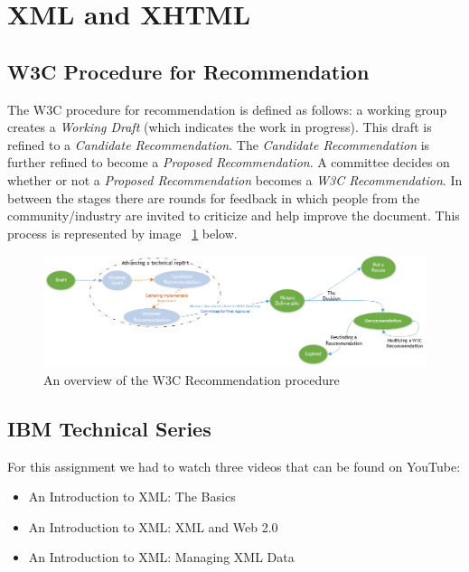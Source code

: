 
\section{XML and XHTML}

\subsection{W3C Procedure for Recommendation}

The W3C procedure for recommendation is defined as follows: a working group creates a \textit{Working Draft} (which indicates the work in progress). This draft is refined to a \textit{Candidate Recommendation}. The \textit{Candidate Recommendation} is further refined to become a \textit{Proposed Recommendation}. A committee decides on whether or not a \textit{Proposed Recommendation} becomes a \textit{W3C Recommendation}. In between the stages there are rounds for feedback in which people from the community/industry are invited to criticize and help improve the document. This process is represented by image ~\ref{fig:RecommendationProcedure} below.

\vspace{10pt}

\begin{figure}[here]
	\centering
	\includegraphics[width=1.0\textwidth]{images/w3c.png}
	\caption{An overview of the W3C Recommendation procedure}
	\label{fig:RecommendationProcedure}
\end{figure}

\subsection{IBM Technical Series}

For this assignment we had to watch three videos that can be found on YouTube:
\begin{itemize}
\item An Introduction to XML: The Basics \citep{ibmtechnicalpart1}
\item An Introduction to XML: XML and Web 2.0 \citep{ibmtechnicalpart2}
\item An Introduction to XML: Managing XML Data \citep{ibmtechnicalpart3}
\end{itemize}


